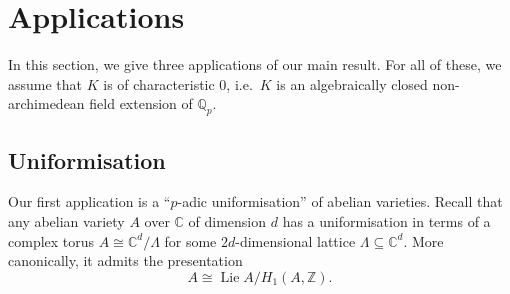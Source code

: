 \documentclass[10pt,oneside]{amsart}
\theoremstyle{definition}
\newcommand{\Z}{\mathbb{Z}}
\newcommand{\Q}{\mathbb{Q}}
\begin{document}
	
 
	\section{Applications}
	In this section, we give three applications of our main result. For all of these, we assume that $K$ is of characteristic $0$, i.e.\ $K$ is an algebraically closed non-archimedean field extension of $\Q_p$.
	\subsection{Uniformisation}
	Our first application is a ``$p$-adic uniformisation'' of abelian varieties.
	Recall that any abelian variety $A$ over $\mathbb C$ of dimension $d$ has a uniformisation in terms of a complex torus $A\cong \mathbb C^d/\Lambda$ for some $2d$-dimensional lattice $\Lambda\subseteq \mathbb C^d$. More canonically, it admits the presentation
\[
 A\cong \operatorname{Lie} A/H_1(A,\Z).
\]
	
\end{document}
